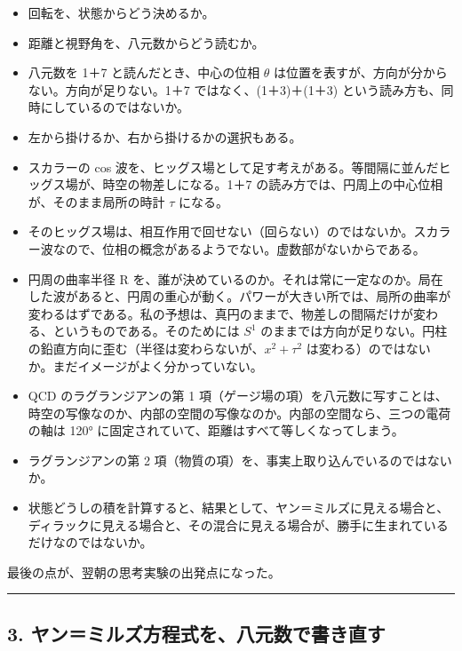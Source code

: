 \documentclass[
  a4paper,
]{ltjsarticle}
\providecommand{\tightlist}{%
  \setlength{\itemsep}{0pt}\setlength{\parskip}{0pt}}
\begin{document}
\begin{itemize}
\tightlist
\item
  回転を、状態からどう決めるか。
\item
  距離と視野角を、八元数からどう読むか。
\item
  八元数を 1＋7 と読んだとき、中心の位相 \(\theta\)
  は位置を表すが、方向が分からない。方向が足りない。1＋7
  ではなく、(1＋3)＋(1＋3) という読み方も、同時にしているのではないか。
\item
  左から掛けるか、右から掛けるかの選択もある。
\item
  スカラーの cos
  波を、ヒッグス場として足す考えがある。等間隔に並んだヒッグス場が、時空の物差しになる。1＋7
  の読み方では、円周上の中心位相が、そのまま局所の時計 \(\tau\) になる。
\item
  そのヒッグス場は、相互作用で回せない（回らない）のではないか。スカラー波なので、位相の概念があるようでない。虚数部がないからである。
\item
  円周の曲率半径 R
  を、誰が決めているのか。それは常に一定なのか。局在した波があると、円周の重心が動く。パワーが大きい所では、局所の曲率が変わるはずである。私の予想は、真円のままで、物差しの間隔だけが変わる、というものである。そのためには
  \(S^1\)
  のままでは方向が足りない。円柱の鉛直方向に歪む（半径は変わらないが、\(x^2 + \tau^2\)
  は変わる）のではないか。まだイメージがよく分かっていない。
\item
  QCD のラグランジアンの第 1
  項（ゲージ場の項）を八元数に写すことは、時空の写像なのか、内部の空間の写像なのか。内部の空間なら、三つの電荷の軸は
  120° に固定されていて、距離はすべて等しくなってしまう。
\item
  ラグランジアンの第 2
  項（物質の項）を、事実上取り込んでいるのではないか。
\item
  状態どうしの積を計算すると、結果として、ヤン＝ミルズに見える場合と、ディラックに見える場合と、その混合に見える場合が、勝手に生まれているだけなのではないか。
\end{itemize}

最後の点が、翌朝の思考実験の出発点になった。

\begin{center}\rule{0.5\linewidth}{0.5pt}\end{center}

\subsection{3.
ヤン＝ミルズ方程式を、八元数で書き直す}\label{ux30e4ux30f3ux30dfux30ebux30baux65b9ux7a0bux5f0fux3092ux516bux5143ux6570ux3067ux66f8ux304dux76f4ux3059}
\end{document}
